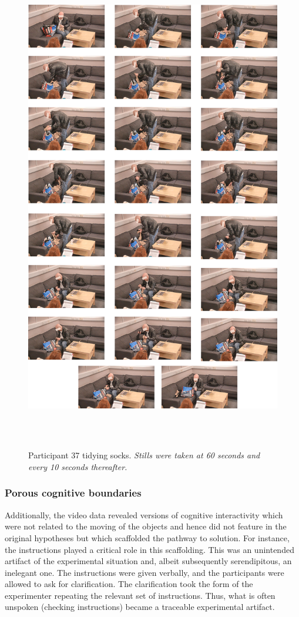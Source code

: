 \documentclass[twocolumn, issue, empirical, authordate,drafn]{jote-new-article}
\begin{document}
\begin{figure}
\includegraphics[width=5.25905in,height=8.51806in]{media/image4.png} 
\caption{Participant 37 tidying socks. \emph{Stills were taken at 60 seconds and every 10 seconds thereafter.}}
\label{fig:figure4}
\end{figure}



\subsubsection{Porous cognitive boundaries}

Additionally, the video data revealed versions of cognitive interactivity which were not related to the moving of the objects and hence did not feature in the original hypotheses but which scaffolded the pathway to solution. For instance, the instructions played a critical role in this scaffolding. This was an unintended artifact of the experimental situation and, albeit subsequently serendipitous, an inelegant one. The instructions were given verbally, and the participants were allowed to ask for clarification. The clarification took the form of the experimenter repeating the relevant set of instructions. Thus, what is often unspoken (checking instructions) became a traceable experimental artifact. 
\end{document}
